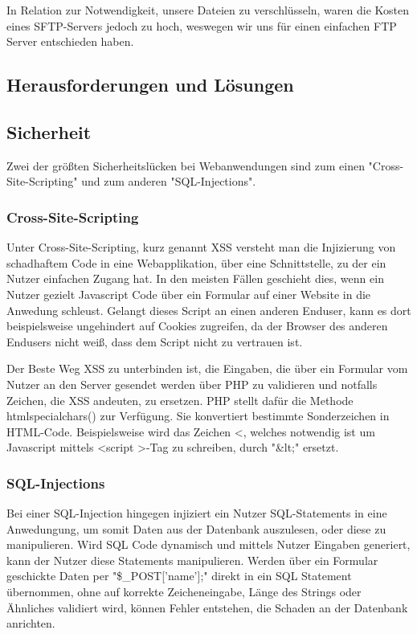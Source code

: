 {    In Relation zur Notwendigkeit, unsere Dateien zu verschlüsseln, waren die Kosten eines SFTP-Servers jedoch zu hoch, weswegen wir uns für einen einfachen FTP Server entschieden haben.

  \subsection{Herausforderungen und Lösungen}

    \subsection*{Sicherheit}
    Zwei der größten Sicherheitslücken bei Webanwendungen sind zum einen {"Cross-Site-Scripting"\cite{xss}} und zum anderen {"SQL-Injections"\cite{sqlinjections}}.

      \subsubsection*{Cross-Site-Scripting}
      Unter Cross-Site-Scripting, kurz genannt XSS versteht man die Injizierung von schadhaftem Code in eine Webapplikation, über eine Schnittstelle, zu der ein Nutzer
      einfachen Zugang hat. In den meisten Fällen geschieht dies, wenn ein Nutzer gezielt Javascript Code über ein Formular auf einer Website in die Anwedung schleust.
      Gelangt dieses Script an einen anderen Enduser, kann es dort beispielsweise ungehindert auf Cookies zugreifen, da der Browser des anderen Endusers nicht weiß,
      dass dem Script nicht zu vertrauen ist.

      Der Beste Weg XSS zu unterbinden ist, die Eingaben, die über ein Formular vom Nutzer an den Server gesendet werden über PHP zu validieren und notfalls Zeichen, die
      XSS andeuten, zu ersetzen. PHP stellt dafür die Methode htmlspecialchars() zur Verfügung. Sie konvertiert bestimmte Sonderzeichen in HTML-Code. Beispielsweise wird
      das Zeichen \textless , welches notwendig ist um Javascript mittels \textless script \textgreater-Tag zu schreiben, durch "\&lt;" ersetzt.

      \subsubsection*{SQL-Injections}
      Bei einer SQL-Injection hingegen injiziert ein Nutzer SQL-Statements in eine Anwedungung, um somit Daten aus der Datenbank auszulesen, oder diese zu manipulieren.
      Wird SQL Code dynamisch und mittels Nutzer Eingaben generiert, kann der Nutzer diese Statements manipulieren. Werden über ein Formular
      geschickte Daten per "\$\_POST['name'];" direkt in ein SQL Statement übernommen, ohne auf korrekte Zeicheneingabe, Länge des Strings oder Ähnliches validiert wird,
      können Fehler entstehen, die Schaden an der Datenbank anrichten.

}

